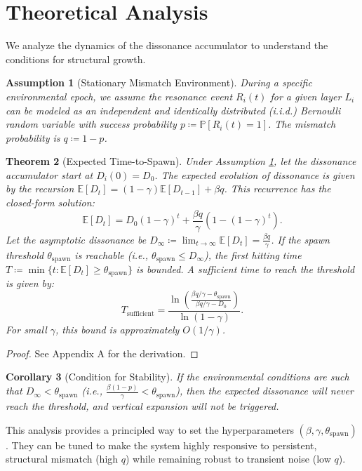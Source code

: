 \documentclass{article}
\newtheorem{theorem}{Theorem}[section]
\newtheorem{corollary}[theorem]{Corollary}
\newtheorem{assumption}[theorem]{Assumption}
\begin{document}
\section{Theoretical Analysis}
We analyze the dynamics of the dissonance accumulator to understand the conditions for structural growth.

\begin{assumption}[Stationary Mismatch Environment]
\label{ass:bernoulli}
During a specific environmental epoch, we assume the resonance event $R_i(t)$ for a given layer $L_i$ can be modeled as an independent and identically distributed (i.i.d.) Bernoulli random variable with success probability $p \coloneqq \mathbb{P}[R_i(t)=1]$. The mismatch probability is $q \coloneqq 1-p$.
\end{assumption}

\begin{theorem}[Expected Time-to-Spawn]
\label{thm:spawn_time}
Under Assumption \ref{ass:bernoulli}, let the dissonance accumulator start at $D_i(0)=D_0$. The expected evolution of dissonance is given by the recursion $\mathbb{E}[D_t] = (1-\gamma)\mathbb{E}[D_{t-1}] + \beta q$. This recurrence has the closed-form solution:
\[
\mathbb{E}[D_t] = D_0(1-\gamma)^t + \frac{\beta q}{\gamma}\left(1-(1-\gamma)^t\right).
\]
Let the asymptotic dissonance be $D_\infty \coloneqq \lim_{t\to\infty} \mathbb{E}[D_t] = \frac{\beta q}{\gamma}$. If the spawn threshold $\theta_{\mathrm{spawn}}$ is reachable (i.e., $\theta_{\mathrm{spawn}} \le D_\infty$), the first hitting time $T \coloneqq \min\{t : \mathbb{E}[D_t] \ge \theta_{\mathrm{spawn}}\}$ is bounded. A sufficient time to reach the threshold is given by:
\[
T_{\mathrm{sufficient}} = \frac{\ln\left(\frac{\beta q/\gamma - \theta_{\mathrm{spawn}}}{\beta q/\gamma - D_0}\right)}{\ln(1-\gamma)}.
\]
For small $\gamma$, this bound is approximately $O(1/\gamma)$.
\end{theorem}
\begin{proof} See Appendix A for the derivation. \end{proof}

\begin{corollary}[Condition for Stability]
If the environmental conditions are such that $D_\infty < \theta_{\mathrm{spawn}}$ (i.e., $\frac{\beta(1-p)}{\gamma} < \theta_{\mathrm{spawn}}$), then the expected dissonance will never reach the threshold, and vertical expansion will not be triggered.
\end{corollary}

This analysis provides a principled way to set the hyperparameters $(\beta, \gamma, \theta_{\text{spawn}})$. They can be tuned to make the system highly responsive to persistent, structural mismatch (high $q$) while remaining robust to transient noise (low $q$).
\end{document}
